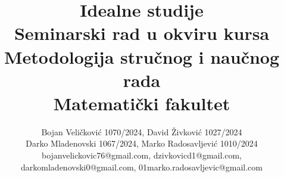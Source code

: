\documentclass[a4paper]{article}
\begin{document}
\title{Idealne studije\\ \small{Seminarski rad u okviru kursa\\Metodologija stručnog i naučnog rada\\ Matematički fakultet}}

\author{Bojan Veličković 1070/2024, David Živković 1027/2024\\ Darko Mladenovski 1067/2024, Marko Radosavljević 1010/2024\\bojanvelickovic76@gmail.com, dzivkovicd1@gmail.com,\\ darkomladenovski0@gmail.com, 01marko.radosavljevic@gmail.com}



\maketitle
\end{document}
